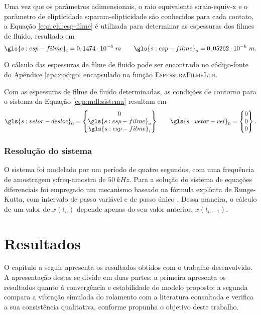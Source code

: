 \documentclass[12pt,oneside,english,brazil,lmodern,siglas,simbolos,cite=num]{ucsmonograph}
\begin{document}
	Uma vez que os parâmetros adimensionais, o raio equivalente \gls{s:raio-equiv-x} e o parâmetro de elipticidade \gls{s:param-elipticidade} são conhecidos para cada contato, a Equação \ref{eqn:ehl:esp-filme} é utilizada para determinar as espessuras dos filmes de fluido, resultado em
	\begin{equation*}
		\gls{s:esp-filme}_i = 0,1474\cdot 10^{-6}\ m \qquad
		\gls{s:esp-filme}_o = 0,05262\cdot 10^{-6}\ m.
	\end{equation*}
	
	O cálculo das espessuras de filme de fluido pode ser encontrado no código-fonte do Apêndice \ref{apc:codigo} encapsulado na função \textsc{EspessuraFilmeLub}.
	
	Com as espessuras de filme de fluido determinadas, as condições de contorno para o sistema da Equação \ref{eqn:mdl:sistema} resultam em
	\begin{equation*}
		\gls{s:vetor-desloc}_0 =
		\begin{Bmatrix}
		0 \\ \gls{s:esp-filme}_o \\ \gls{s:esp-filme}_i
		\end{Bmatrix} \qquad
		\gls{s:vetor-vel}_0 = 
		\begin{Bmatrix}
		0 \\ 0 \\ 0
		\end{Bmatrix}.
	\end{equation*}
	
	\subsection{Resolução do sistema}
	O sistema foi modelado por um período de quatro segundos, com uma frequência de amostragem \gls{s:freq-amostra} de $50\ kHz$. 
	Para a solução do sistema de equações diferenciais foi empregado um mecanismo baseado na fórmula explícita de Runge-Kutta, com intervalo de passo variável e de passo único \cite{ode45}.
	Dessa maneira, o cálculo de um valor de $x(t_n)$ depende apenas do seu valor anterior, $x(t_{n-1})$.
	
	\chapter{Resultados}
	O capítulo a seguir apresenta os resultados obtidos com o trabalho desenvolvido.
	A apresentação destes se divide em duas partes: a primeira apresenta os resultados quanto à convergência e estabilidade do modelo proposto;
	a segunda compara a vibração simulada do rolamento com a literatura consultada e verifica a sua consistência qualitativa, conforme propunha o objetivo deste trabalho.
	
\end{document}
